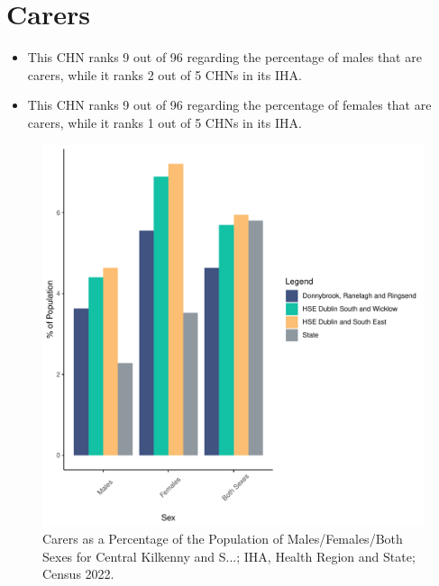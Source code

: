 \documentclass{article}
\begin{document}
\section{Carers}\label{sect:Carers}
\begin{itemize}
\item This CHN ranks  9 out of 96 regarding the percentage of males that are carers, while it ranks   2 out of 5 CHNs in its IHA.
\item This CHN ranks  9 out of 96 regarding the percentage of females that are carers, while it ranks   1 out of 5 CHNs in its IHA.
\end{itemize}
\begin{figure}[H]
	\centering
	\includegraphics[width = 150mm]{../figures/CareED.pdf}
	\caption{Carers as a Percentage of the Population of Males/Females/Both Sexes for Central Kilkenny and S...; IHA, Health Region and State; Census 2022.}
	\label{fig:2ae19629-1a6a-13a3-e055-000000000001}
	\end{figure}
\end{document}
